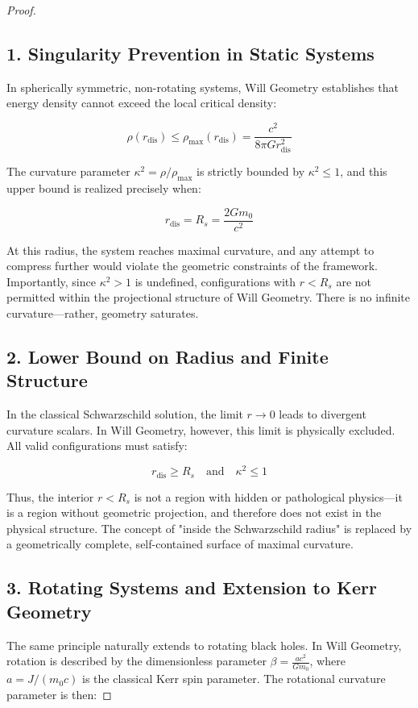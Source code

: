 \documentclass{article}
\begin{document}
\begin{theorem}
\begin{proof}
\subsection*{1. Singularity Prevention in Static Systems}

In spherically symmetric, non-rotating systems, Will Geometry establishes that energy density cannot exceed the local critical density:

\[
\rho(r_{\text{dis}}) \leq \rho_{\text{max}}(r_{\text{dis}}) = \frac{c^2}{8\pi G r_{\text{dis}}^2}
\]

The curvature parameter \( \kappa^2 = \rho / \rho_{\text{max}} \) is strictly bounded by \( \kappa^2 \leq 1 \), and this upper bound is realized precisely when:

\[
r_{\text{dis}} = R_s = \frac{2Gm_0}{c^2}
\]

At this radius, the system reaches maximal curvature, and any attempt to compress further would violate the geometric constraints of the framework. Importantly, since \( \kappa^2 > 1 \) is undefined, configurations with \( r < R_s \) are not permitted within the projectional structure of Will Geometry. There is no infinite curvature—rather, geometry saturates.

\subsection*{2. Lower Bound on Radius and Finite Structure}

In the classical Schwarzschild solution, the limit \( r \to 0 \) leads to divergent curvature scalars. In Will Geometry, however, this limit is physically excluded. All valid configurations must satisfy:

\[
r_{\text{dis}} \geq R_s \quad \text{and} \quad \kappa^2 \leq 1
\]

Thus, the interior \( r < R_s \) is not a region with hidden or pathological physics—it is a region without geometric projection, and therefore does not exist in the physical structure. The concept of "inside the Schwarzschild radius" is replaced by a geometrically complete, self-contained surface of maximal curvature.

\subsection*{3. Rotating Systems and Extension to Kerr Geometry}

The same principle naturally extends to rotating black holes. In Will Geometry, rotation is described by the dimensionless parameter \( \beta = \frac{ac^2}{Gm_0} \), where \( a = J / (m_0 c) \) is the classical Kerr spin parameter. The rotational curvature parameter is then:


\end{proof}
\end{theorem}
\end{document}
